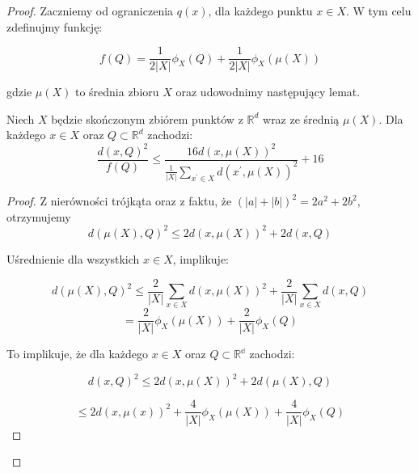 \begin{proof}

\noindent
Zaczniemy od ograniczenia $q(x)$, dla każdego punktu $x \in X$. 
W tym celu zdefinujmy funkcję:

\begin{equation}
    f(Q) = \frac{1}{2|X|}\phi_{X}(Q) + \frac{1}{2|X|}\phi_{X}(\mu(X))
\end{equation}

\noindent
gdzie $\mu(X)$ to średnia zbioru $X$ oraz udowodnimy następujący lemat. 

\begin{lemma}{\cite{bachem2017scalable}}
    Niech $X$ będzie skończonym zbiórem punktów z $\mathbb{R}^{d}$ wraz ze średnią $\mu(X)$. 
    Dla każdego $x \in X$ oraz $Q \subset \mathbb{R}^{d}$ zachodzi:
    \begin{equation}
        \frac{d(x, Q)^2}{f(Q)} \leq \frac{16d(x, \mu(X))^2}{\frac{1}{|X|}\sum_{x^{'} \in X}d(x^{'}, \mu(X))^2} + 16
    \end{equation}
\end{lemma}

\begin{proof}
    \noindent
    Z nierówności trójkąta oraz z faktu, że $(|a| + |b|)^2 = 2a^2 + 2b^2$, otrzymujemy
    \begin{equation}
        d(\mu(X), Q)^2 \leq 2d(x, \mu(X))^2 + 2d(x, Q)
    \end{equation}
    
    \noindent
    Uśrednienie dla wszystkich $x \in X$, implikuje:

    \begin{equation}
        d(\mu(X), Q)^2 \leq \frac{2}{|X|} \sum_{x \in X} d(x, \mu(X))^2 + \frac{2}{|X|} \sum_{x \in X} d(x, Q)
    \end{equation}
    \begin{equation}
       = \frac{2}{|X|} \phi_{X}(\mu(X))+ \frac{2}{|X|} \phi_{X}(Q)
    \end{equation}

    \noindent
    To implikuje, że dla każdego $x \in X$ oraz $Q \subset \mathbb{R^d}$ zachodzi:

    \begin{equation}
        d(x, Q)^2 \leq 2d(x, \mu(X))^2 + 2d(\mu(X), Q)
    \end{equation}

    \begin{equation}
       \leq 2d(x, \mu(x))^2 +  \frac{4}{|X|} \phi_{X}(\mu(X))+ \frac{4}{|X|} \phi_{X}(Q)
    \end{equation}


\end{proof}
\end{proof}

